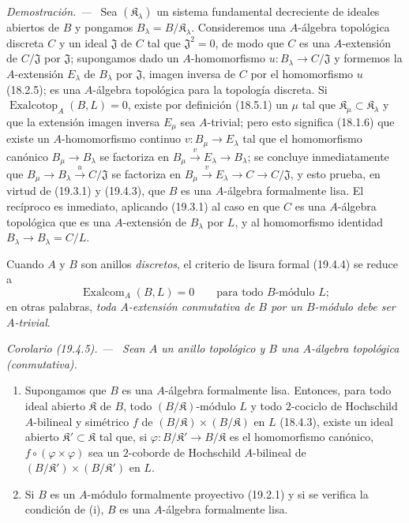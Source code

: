 \documentclass[10pt,oneside]{book}
\makeatletter
\newcommand{\setmanualcurrentlabel}[1]{\def\@currentlabel{#1}}
\newenvironment{corollary}[1][]{%
  \setmanualcurrentlabel{#1}\par\medskip\noindent\itshape Corolario (#1). ---\ }{\par}
\newenvironment{proof}{%
  \par\medskip\noindent\textit{Demostración. ---\ }}{\par}
\makeatother
\begin{document}
\begin{proof}
Sea $(\mathfrak K_\lambda)$ un sistema fundamental decreciente de ideales
abiertos de $B$ y pongamos $B_\lambda=B/\mathfrak K_\lambda$.
Consideremos una $A$-álgebra topológica discreta $C$ y un ideal
$\mathfrak J$ de $C$ tal que $\mathfrak J^2=0$, de modo que $C$ es una
$A$-extensión de $C/\mathfrak J$ por $\mathfrak J$; supongamos dado un
$A$-homomorfismo $u:B_\lambda\to C/\mathfrak J$ y formemos la
$A$-extensión $E_\lambda$ de $B_\lambda$ por $\mathfrak J$, imagen
inversa de $C$ por el homomorfismo $u$ (18.2.5); es una $A$-álgebra
topológica para la topología discreta. Si
$\operatorname{Exalcotop}_A(B,L)=0$, existe por definición (18.5.1) un
$\mu$ tal que $\mathfrak K_\mu\subset\mathfrak K_\lambda$ y que
la extensión imagen inversa $E_\mu$ sea $A$-trivial; pero esto significa
(18.1.6) que existe un $A$-homomorfismo continuo
$v:B_\mu\to E_\lambda$ tal que el homomorfismo canónico
$B_\mu\to B_\lambda$ se factoriza en
$B_\mu\xrightarrow{v}E_\lambda\to B_\lambda$; se concluye
inmediatamente que $B_\mu\to B_\lambda\xrightarrow{u}C/\mathfrak J$ se
factoriza en
$B_\mu\xrightarrow{v}E_\lambda\to C\to C/\mathfrak J$, y esto
prueba, en virtud de (19.3.1) y (19.4.3), que $B$ es una $A$-álgebra
formalmente lisa. El recíproco es inmediato, aplicando (19.3.1) al caso
en que $C$ es una $A$-álgebra topológica que es una $A$-extensión de
$B_\lambda$ por $L$, y al homomorfismo identidad
$B_\lambda\to B_\lambda=C/L$.
\end{proof}

Cuando $A$ y $B$ son anillos \emph{discretos}, el criterio de lisura formal
(19.4.4) se reduce a
\begin{equation}
\tag{19.4.4.1}
\label{0.19.4.4.1-es}
\operatorname{Exalcom}_A(B,L)=0\qquad\text{para todo $B$-módulo $L$};
\end{equation}
en otras palabras, \emph{toda $A$-extensión conmutativa de $B$ por un
$B$-módulo debe ser $A$-trivial}.

\begin{corollary}[19.4.5]
\label{0.19.4.5-es}
Sean $A$ un anillo topológico y $B$ una $A$-álgebra topológica
(conmutativa).
\begin{enumerate}
  \item[\textup{(i)}] Supongamos que $B$ es una $A$-álgebra formalmente lisa.
  Entonces, para todo ideal abierto $\mathfrak K$ de $B$, todo
  $(B/\mathfrak K)$-módulo $L$ y todo $2$-cociclo de Hochschild
  $A$-bilineal y simétrico $f$ de
  $(B/\mathfrak K)\times(B/\mathfrak K)$ en $L$ \textup{(18.4.3)}, existe un
  ideal abierto $\mathfrak K'\subset\mathfrak K$ tal que, si
  $\varphi:B/\mathfrak K'\to B/\mathfrak K$ es el homomorfismo
  canónico, $f\circ(\varphi\times\varphi)$ sea un $2$-coborde de
  Hochschild $A$-bilineal de
  $(B/\mathfrak K')\times(B/\mathfrak K')$ en $L$.
  \item[\textup{(ii)}] Si $B$ es un $A$-módulo formalmente proyectivo \textup{(19.2.1)} y si
  se verifica la condición de \textup{(i)}, $B$ es una $A$-álgebra formalmente
  lisa.
\end{enumerate}
\end{corollary}
\end{document}
